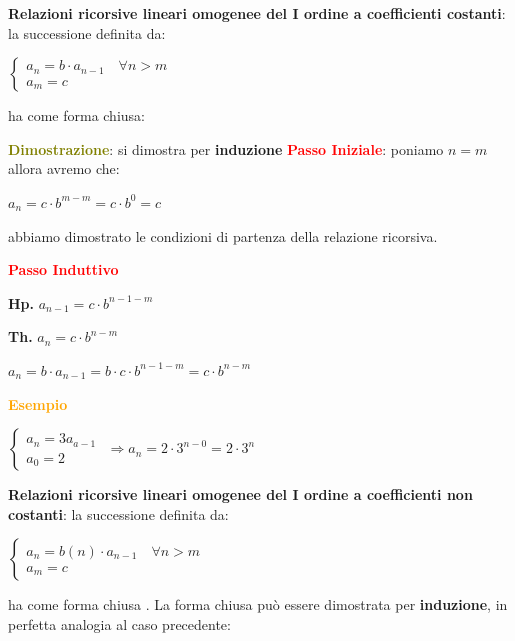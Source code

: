 \begin{flushleft}
    \textbf{Relazioni ricorsive lineari omogenee del I ordine a coefficienti costanti}: la successione definita da: 

    {\centering
        $\begin{cases}
            a_n = b \cdot a_{n - 1} \quad \forall n > m \\
            a_m = c
        \end{cases}$
    \par}
    ha come forma chiusa: 

    \begin{boxA}
        \textcolor{olive}{\textbf{Dimostrazione}}: si dimostra per \textbf{induzione} \newline
        \textcolor{red}{\textbf{Passo Iniziale}}: poniamo $n = m$ allora avremo che: 

        {\centering
            $a_n = c \cdot b^{m - m} = c \cdot b^0 = c$
        \par}
        abbiamo dimostrato le condizioni di partenza della relazione ricorsiva.

        \textcolor{red}{\textbf{Passo Induttivo}}

        {\centering
            \begin{minipage}[t]{0.45\textwidth}
                \centering
                \textbf{Hp.} $a_{n - 1} = c \cdot b^{n - 1 - m}$
            \end{minipage}
            \begin{minipage}[t]{0.45\textwidth}
                \centering
                \textbf{Th.} $a_n = c \cdot b^{n - m}$
            \end{minipage}
            $a_n = b \cdot a_{n - 1} = b \cdot c \cdot b^{n - 1 - m} = c \cdot b^{n - m}$
        \par}

        \textcolor{orange}{\textbf{Esempio}}

        {\centering
            $\begin{cases}
                a_n = 3a_{a - 1} \\
                a_0 = 2
            \end{cases}$
            $\Rightarrow a_n = 2 \cdot 3^{n - 0} = 2 \cdot 3^n$
        \par}
    \end{boxA}
    \textbf{Relazioni ricorsive lineari omogenee del I ordine a coefficienti non costanti}: la successione definita da:

    {\centering
        $\begin{cases}
            a_n = b(n) \cdot a_{n - 1} \quad \forall n > m \\
            a_m = c
        \end{cases}$
    \par}
    ha come forma chiusa . La forma chiusa può essere dimostrata per \textbf{induzione}, in perfetta analogia al caso precedente:
\end{flushleft}

